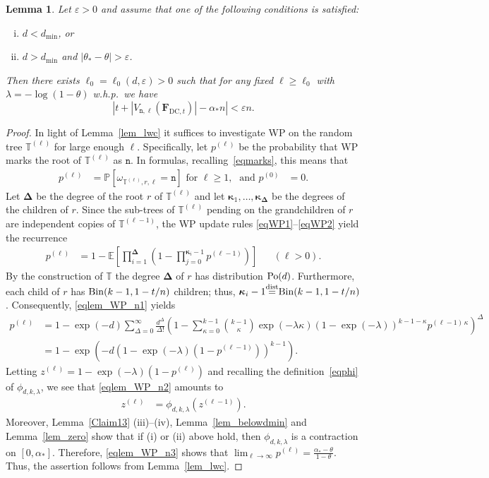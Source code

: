 \documentclass[10pt,reqno]{amsart}
\numberwithin{equation}{section}
\renewcommand{\vec}[1]{\boldsymbol{#1}}
\newcommand\dmin{d_{\mathrm{min}}}
\newcommand{\FDC}[1]{\PHI_{\mathrm{DC},{#1}}}
\newcommand{\nll}{\mathtt{n}}
\newcommand\disteq{\stacksign{dist}{=}}
\newcommand{\TT}{\mathbb T}
\newcommand\PHI{\vec F}
\newcommand\eps{\varepsilon}
\newcommand\Erw{\mathbb{E}}
\newcommand\ex{\Erw}
\newcommand{\Po}{{\rm Po}}
\newcommand{\Bin}{{\rm Bin}}
\newcommand\bc[1]{\left({#1}\right)}
\newcommand\brk[1]{\left\lbrack{#1}\right\rbrack}
\newcommand\abs[1]{\left|{#1}\right|}
\newcommand{\whp}{w.h.p.}
\newcommand{\stacksign}[2]{{\stackrel{\mbox{\scriptsize #1}}{#2}}}
\newcommand\pr{\mathbb{P}}
\newcommand\Lem{Lemma}
\newtheorem{lemma}[definition]{Lemma}
\def\pr{{\mathbb P}}
\newcommand{\ph}{\phi_{d,k,\lambda}}
\begin{document}
\begin{lemma}\label{lem_WP_n}
	Let $\eps>0$ and assume that one of the following conditions is satisfied:
	\begin{enumerate}[(i)]
		\item $d<\dmin$, or
		\item $d>\dmin$ and $|\theta_*-\theta|>\eps$. \end{enumerate}
	Then there exists $\ell_0=\ell_0(d,\eps)>0$ such that for any fixed $\ell\geq\ell_0$ with $\lambda=-\log(1-\theta)$ \whp\ we have
	$$\abs{t+|V_{\nll,\ell}(\FDC{t})|-\alpha_*n}<\eps n.$$
\end{lemma}
\begin{proof}
	In light of \Lem~\ref{lem_lwc} it suffices to investigate WP on the random tree $\TT^{(\ell)}$ for large enough $\ell$.
	Specifically, let $p^{(\ell)}$ be the probability that WP marks the root of $\TT^{(\ell)}$ as $\nll$.
	In formulas, recalling~\eqref{eqmarks}, this means that
	\begin{align}\label{eqlem_WP_n0}
	p^{(\ell)}&=\pr\brk{\omega_{\TT^{(\ell)},r,\ell}=\nll}\mbox{ for $\ell\geq1$,}&\mbox{and }p^{(0)}&=0. 
	\end{align}
	Let $\vec\Delta$ be the degree of the root $r$ of $\TT^{(\ell)}$ and let $\vec\kappa_1,\ldots,\vec\kappa_{\vec\Delta}$ be the degrees of the children of $r$.
	Since the sub-trees of $\TT^{(\ell)}$ pending on the grandchildren of $r$ are independent copies of $\TT^{(\ell-1)}$, the WP update rules \eqref{eqWP1}--\eqref{eqWP2} yield the recurrence
	\begin{align}\label{eqlem_WP_n1}
		p^{(\ell)}&=1-\ex\brk{\prod_{i=1}^{\vec\Delta}\bc{1-\prod_{j=0}^{\vec\kappa_i-1}p^{(\ell-1)}}}&&(\ell>0).
	\end{align}
	By the construction of $\TT$ the degree $\vec\Delta$ of $r$ has distribution $\Po(d)$.
	Furthermore, each child of $r$ has $\Bin(k-1,1-t/n)$ children; thus, $\vec\kappa_i-1\disteq\Bin(k-1,1-t/n)$.
	Consequently, \eqref{eqlem_WP_n1} yields
	\begin{align}\nonumber
		p^{(\ell)}&=1-\exp(-d)
		\sum_{\Delta=0}^\infty\frac{d^\Delta}{\Delta!}\bc{1-\sum_{\kappa=0}^{k-1}\binom{k-1}\kappa \exp(-\lambda\kappa)(1-\exp(-\lambda))^{k-1-\kappa} p^{(\ell-1)\,\kappa}}^\Delta\\
				  &=1-\exp\bc{-d\bc{1-\exp(-\lambda)(1-p^{(\ell-1)})}^{k-1}}.\label{eqlem_WP_n2}
	\end{align}
	Letting $z^{(\ell)}=1-\exp(-\lambda)(1-p^{(\ell)})$ and recalling the definition~\eqref{eqphi} of $\ph$, we see that \eqref{eqlem_WP_n2} amounts to
	\begin{align}\label{eqlem_WP_n3}
		z^{(\ell)}&=\ph(z^{(\ell-1)}).
	\end{align}
	Moreover, \Lem~\ref{Claim13} (iii)--(iv), \Lem~\ref{lem_belowdmin} and \Lem~\ref{lem_zero} show that if (i) or (ii) above hold, then  $\ph$ is a contraction on $[0,\alpha_*]$.
	Therefore, \eqref{eqlem_WP_n3} shows that $\lim_{\ell\to\infty}p^{(\ell)}=\frac{\alpha_*-\theta}{1-\theta}$.
	Thus, the assertion follows from \Lem~\ref{lem_lwc}.
\end{proof}
\end{document}
